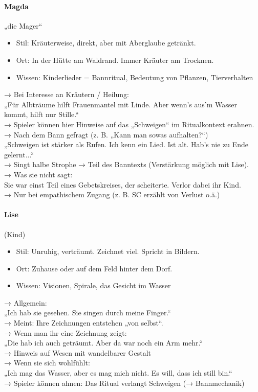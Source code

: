 \paragraph{Magda} „die Mager“
\begin{itemize}
\item Stil: Kräuterweise, direkt, aber mit Aberglaube getränkt.
\item Ort: In der Hütte am Waldrand. Immer Kräuter am Trocknen.
\item Wissen: Kinderlieder = Bannritual, Bedeutung von Pflanzen, Tierverhalten
\end{itemize}
→ Bei Interesse an Kräutern / Heilung:\\
„Für Albträume hilft Frauenmantel mit Linde. Aber wenn’s aus’m Wasser kommt, hilft nur Stille.“\\
→ Spieler können hier Hinweise auf das „Schweigen“ im Ritualkontext erahnen.\\
→ Nach dem Bann gefragt (z. B. „Kann man sowas aufhalten?“)\\
„Schweigen ist stärker als Rufen. Ich kenn ein Lied. Ist alt. Hab’s nie zu Ende gelernt...“\\
→ Singt halbe Strophe → Teil des Banntexts (Verstärkung möglich mit Lise).\\
→ Was sie nicht sagt:\\
Sie war einst Teil eines Gebetskreises, der scheiterte. Verlor dabei ihr Kind.\\
→ Nur bei empathischem Zugang (z. B. SC erzählt von Verlust o.ä.)
\paragraph{Lise} (Kind)
\begin{itemize}
\item Stil: Unruhig, verträumt. Zeichnet viel. Spricht in Bildern.
\item Ort: Zuhause oder auf dem Feld hinter dem Dorf.
\item Wissen: Visionen, Spirale, das Gesicht im Wasser
\end{itemize}
→ Allgemein:\\
„Ich hab sie gesehen. Sie singen durch meine Finger.“\\
→ Meint: Ihre Zeichnungen entstehen „von selbst“.\\
→ Wenn man ihr eine Zeichnung zeigt:\\
„Die hab ich auch geträumt. Aber da war noch ein Arm mehr.“\\
→ Hinweis auf Wesen mit wandelbarer Gestalt\\
→ Wenn sie sich wohlfühlt:\\
„Ich mag das Wasser, aber es mag mich nicht. Es will, dass ich still bin.“\\
→ Spieler können ahnen: Das Ritual verlangt Schweigen (→ Bannmechanik)
